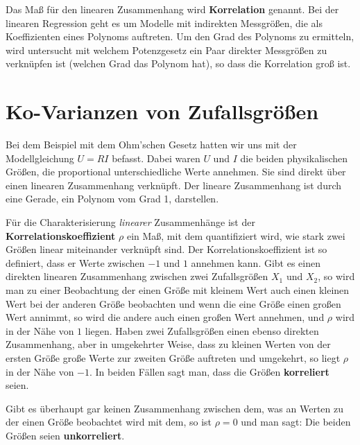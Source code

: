 Das Maß für den linearen Zusammenhang wird \textbf{Korrelation} genannt.
Bei der linearen Regression geht es um Modelle mit indirekten Messgrößen,
die als Koeffizienten eines Polynoms auftreten. Um den Grad des Polynoms zu ermitteln, wird untersucht
mit welchem Potenzgesetz ein Paar direkter Messgrößen zu verknüpfen ist (welchen Grad das Polynom hat),
so dass die Korrelation groß ist.


\section{Ko-Varianzen von Zufallsgrößen}
\label{Kap1Kovarianzen}

Bei dem Beispiel mit dem Ohm'schen Gesetz hatten wir uns mit der Modellgleichung $U = R I$ befasst.
Dabei waren $U$ und $I$ die beiden physikalischen Größen, die proportional unterschiedliche Werte annehmen.
Sie sind direkt über einen linearen Zusammenhang verknüpft. Der lineare Zusammenhang
ist durch eine Gerade, ein Polynom vom Grad 1, darstellen.

Für die Charakterisierung \textsl{linearer} Zusammenhänge ist der
\textbf{Korrelationskoeffizient} $\rho$ ein Maß, mit dem quantifiziert wird, wie
stark zwei Größen linear miteinander verknüpft sind.
Der Korrelationskoeffizient ist so definiert, dass er Werte zwischen $-1$ und
$1$ annehmen kann. Gibt es einen direkten linearen Zusammenhang zwischen zwei Zufallsgrößen
$X_1$ und $X_2$, so wird man zu einer Beobachtung der einen Größe mit kleinem Wert
auch einen kleinen Wert bei der anderen Größe beobachten und wenn die eine Größe einen
großen Wert annimmt, so wird die andere auch einen großen Wert annehmen, und
$\rho$ wird in der Nähe von $1$ liegen. Haben zwei Zufallsgrößen einen ebenso
direkten Zusammenhang, aber in umgekehrter Weise, dass zu kleinen Werten von der ersten
Größe große Werte zur zweiten Größe auftreten und umgekehrt, so liegt $\rho$ in der Nähe von $-1$.
In beiden Fällen sagt man, dass die Größen \textbf{korreliert} seien.

Gibt es überhaupt gar keinen Zusammenhang zwischen dem, was an Werten zu der einen Größe beobachtet
wird mit dem, so ist $\rho = 0$ und man sagt: Die beiden Größen seien \textbf{unkorreliert}.

